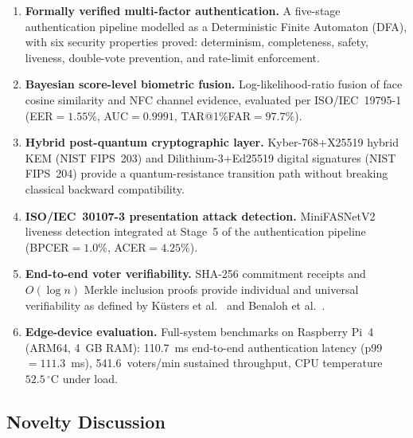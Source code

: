 \documentclass[preprint,12pt]{elsarticle}
\begin{document}
\begin{enumerate}[label=\textbf{C\arabic*.}]
  \item \textbf{Formally verified multi-factor authentication.}
        A five-stage authentication pipeline modelled as a Deterministic
        Finite Automaton (DFA), with six security properties proved:
        determinism, completeness, safety, liveness, double-vote
        prevention, and rate-limit enforcement.

  \item \textbf{Bayesian score-level biometric fusion.}
        Log-likelihood-ratio fusion of face cosine similarity and NFC
        channel evidence, evaluated per ISO/IEC~19795-1 (EER$=1.55\%$,
        AUC$=0.9991$, TAR@1\%FAR$=97.7\%$).

  \item \textbf{Hybrid post-quantum cryptographic layer.}
        Kyber-768$+$X25519 hybrid KEM (NIST FIPS~203) and
        Dilithium-3$+$Ed25519 digital signatures (NIST FIPS~204) provide a
        quantum-resistance transition path without breaking classical
        backward compatibility.

  \item \textbf{ISO/IEC~30107-3 presentation attack detection.}
        MiniFASNetV2 liveness detection integrated at Stage~5 of the
        authentication pipeline (BPCER$=1.0\%$, ACER$=4.25\%$).

  \item \textbf{End-to-end voter verifiability.}
        SHA-256 commitment receipts and $O(\log n)$ Merkle inclusion proofs
        provide individual and universal verifiability as defined by
        Küsters et al.~\cite{kusters2010accountability} and
        Benaloh et al.~\cite{benaloh2011e2e}.

  \item \textbf{Edge-device evaluation.}
        Full-system benchmarks on Raspberry Pi~4 (ARM64, 4~GB RAM):
        110.7~ms end-to-end authentication latency (p99$=111.3$~ms),
        541.6~voters/min sustained throughput, CPU temperature~$52.5\,^\circ$C
        under load.
\end{enumerate}

\subsection{Novelty Discussion}
\end{document}

